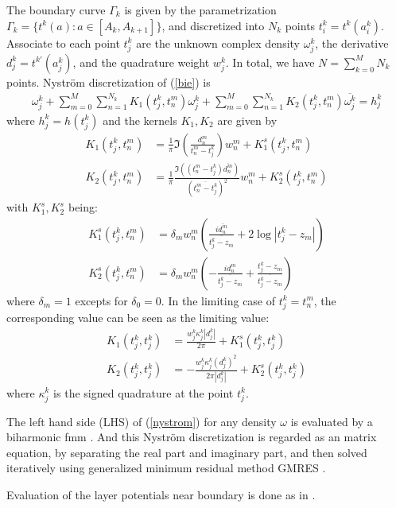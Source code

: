 \documentclass[10pt,twocolumn]{article}
\begin{document}
The boundary curve $\Gamma_k$ is given by the parametrization $\Gamma_k = \{ t^k(a): a\in \left[A_k,A_{k+1}\right]\}$, 
and discretized into $N_k$ points $t^k_i = t^k(a^k_i)$. 
Associate to each point $t^k_j$ are the unknown complex density $\omega^k_j$, 
the derivative $d^k_j = t^{k\prime}(a^k_j)$, 
and the quadrature weight $w^k_j$. In total, we have $N= \sum_{k=0}^M N_k$ points. Nystr\"om discretization of (\ref{bie}) is
\begin{align}
  \omega_j^k 
  + \sum_{m=0}^{M}\sum_{n=1}^{N_k} K_1(t^k_j,t^m_n) \omega^k_j 
  + \sum_{m=0}^{M}\sum_{n=1}^{N_k} K_2(t^k_j,t^m_n) \overline{\omega^k_j} = h^k_j
  \label{nystrom}
\end{align} where $h^k_j = h(t^k_j)$ and the kernels $K_1, K_2$ are given by 
\begin{align}
  K_1(t^k_j, t^m_n) 
  &= \frac{1}{\pi} \Im (\frac{d^m_n}{t^m_n-t^k_j})w^m_n + K_1^s(t^k_j,t^m_n)\\
  K_2(t^k_j, t^m_n) 
  &= \frac{1}{\pi} \frac{\Im((t^m_n-t^k_j)\overline{d^m_n})}{(\overline{t^m_n - t^k_j})^2} w^m_n + K_2^s(t^k_j,t^m_n)
\end{align}
with $K_1^s, K_2^s$ being: 
\begin{align}
  K_1^s(t^k_j,t^m_n) &= \delta_m w^m_n \left(\frac{i\overline{d^m_n}}{\overline{t^k_j - z_m}}
  + 2 \log |t^k_j - z_m| \right)\\
  K_2^s(t^k_j,t^m_n) &= \delta_{m}w^m_n \left(- \frac{id^m_n}{\overline{t^k_j - z_m}} + \frac{t^k_j-z_m}{\overline{t^k_j - z_m}}\right) 
\end{align}
where $\delta_m = 1$ excepts for $\delta_0 = 0$. In the limiting case of $t^k_j = t^m_n$, the corresponding value can be seen as the limiting value:
\begin{align}
  K_1(t^k_j, t^k_j) &= \frac{w^k_j \kappa^k_j|d^k_j|}{2\pi} + K_1^s(t^k_j,t^k_j) \\
  K_2(t^k_j, t^k_j) &= -\frac{w^k_j\kappa^k_j(d^k_j)^2}{2\pi|d^k_j|} + K_2^s(t^k_j,t^k_j)
\end{align}where $\kappa^k_j$ is the signed quadrature at the point $t^k_j$. 

The left hand side (LHS) of (\ref{nystrom}) for any density $\omega$ is evaluated by a biharmonic fmm 
\cite{FlatironinstituteFmm2d2022}. 
And this Nystr\"om discretization is regarded as an matrix equation, 
by separating the real part and imaginary part, 
and then solved iteratively using 
generalized minimum residual method GMRES \cite{saadGMRESGeneralizedMinimal1986}. 

Evaluation of the layer potentials near boundary is done as in \cite{wuSolutionStokesFlow2020}. 
\end{document}

